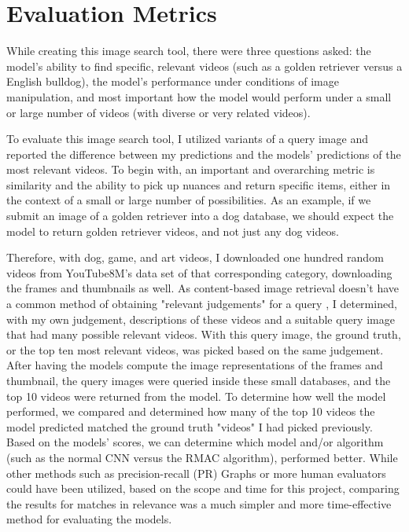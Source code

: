 \documentclass[10pt,twocolumn]{article}
\begin{document}

\section{Evaluation Metrics}

While creating this image search tool, there were three questions asked: the model's ability to find specific, relevant videos (such as a golden retriever versus a English bulldog), the model's performance under conditions of image manipulation, and most important how the model would perform under a small or large number of videos (with diverse or very related videos).

To evaluate this image search tool, I utilized variants of a query image and reported the difference between my predictions and the models' predictions of the most relevant videos. To begin with, an important and overarching metric is similarity and the ability to pick up nuances and return specific items, either in the context of a small or large number of possibilities. As an example, if we submit an image of a golden retriever into a dog database, we should expect the model to return golden retriever videos, and not just any dog videos.

Therefore, with dog, game, and art videos, I downloaded one hundred random videos from YouTube8M's data set of that corresponding category, downloading the frames and thumbnails as well. As content-based image retrieval doesn't have a common method of obtaining "relevant judgements" for a query \cite{Muller2001}, I determined, with my own judgement, descriptions of these videos and a suitable query image that had many possible relevant videos. With this query image, the ground truth, or the top ten most relevant videos, was picked based on the same judgement. After having the models compute the image representations of the frames and thumbnail, the query images were queried inside these small databases, and the top 10 videos were returned from the model. To determine how well the model performed, we compared and determined how many of the top 10 videos the model predicted matched the ground truth "videos" I had picked previously. Based on the models' scores, we can determine which model and/or algorithm (such as the normal CNN versus the RMAC algorithm), performed better. While other methods such as precision-recall (PR) Graphs \cite{Muller2001} or more human evaluators could have been utilized, based on the scope and time for this project, comparing the results for matches in relevance was a much simpler and more time-effective method for evaluating the models.
\end{document}
